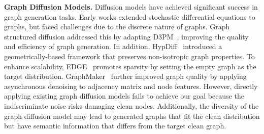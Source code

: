 \textbf{Graph Diffusion Models.}
Diffusion models have achieved significant success in graph generation tasks. Early works  \cite{niu2020permutation,jo2022score} extended stochastic differential equations to graphs, but faced challenges due to the discrete nature of graphs. Graph structured diffusion \cite{vignac2022digress,haefeli2022diffusion} addressed this by adapting D3PM~\cite{austin2021structured}, improving the quality and efficiency of graph generation. In addition, HypDiff~\cite{fu2024hyperbolic} introduced a geometrically-based framework that preserves non-isotropic graph properties.
To enhance scalability, EDGE~\cite{chen2023efficient} promotes sparsity by setting the empty graph as the target distribution. 
GraphMaker~\cite{li2023graphmaker} further improved graph quality by applying asynchronous denoising to adjacency matrix and node features.
However, directly applying existing graph diffusion models fails to achieve our goal because the indiscriminate noise risks damaging clean nodes. Additionally, the diversity of the graph diffusion model may lead to generated graphs that fit the clean distribution but have semantic information that differs from the target clean graph.
